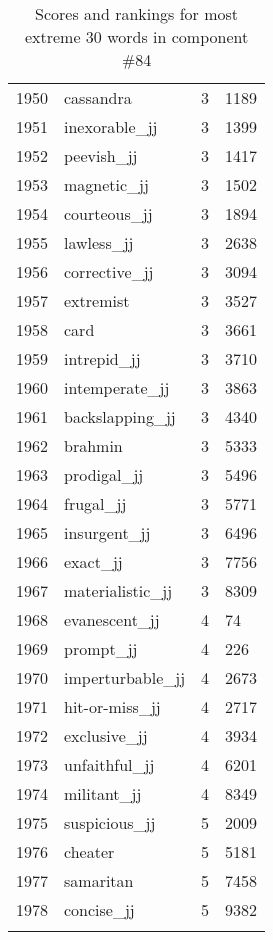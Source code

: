 \begin{longtable}[!htbp]{| rlr@{.}l |}
    1950 & cassandra & 3 & 1189 \\
    1951 & inexorable\_jj & 3 & 1399 \\
    1952 & peevish\_jj & 3 & 1417 \\
    1953 & magnetic\_jj & 3 & 1502 \\
    1954 & courteous\_jj & 3 & 1894 \\
    1955 & lawless\_jj & 3 & 2638 \\
    1956 & corrective\_jj & 3 & 3094 \\
    1957 & extremist & 3 & 3527 \\
    1958 & card & 3 & 3661 \\
    1959 & intrepid\_jj & 3 & 3710 \\
    1960 & intemperate\_jj & 3 & 3863 \\
    1961 & backslapping\_jj & 3 & 4340 \\
    1962 & brahmin & 3 & 5333 \\
    1963 & prodigal\_jj & 3 & 5496 \\
    1964 & frugal\_jj & 3 & 5771 \\
    1965 & insurgent\_jj & 3 & 6496 \\
    1966 & exact\_jj & 3 & 7756 \\
    1967 & materialistic\_jj & 3 & 8309 \\
    1968 & evanescent\_jj & 4 & 74 \\
    1969 & prompt\_jj & 4 & 226 \\
    1970 & imperturbable\_jj & 4 & 2673 \\
    1971 & hit-or-miss\_jj & 4 & 2717 \\
    1972 & exclusive\_jj & 4 & 3934 \\
    1973 & unfaithful\_jj & 4 & 6201 \\
    1974 & militant\_jj & 4 & 8349 \\
    1975 & suspicious\_jj & 5 & 2009 \\
    1976 & cheater & 5 & 5181 \\
    1977 & samaritan & 5 & 7458 \\
    1978 & concise\_jj & 5 & 9382 \\
    \hline
    \caption{Scores and rankings for most extreme 30 words in component \#84} \\
\end{longtable}
